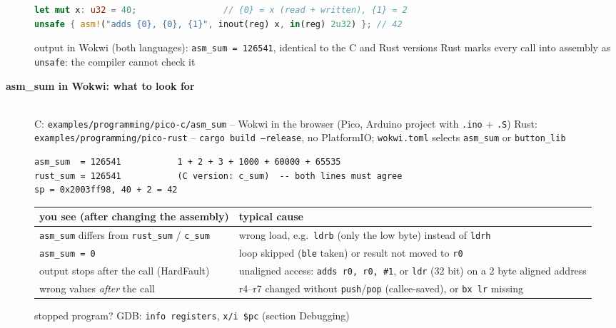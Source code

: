 \begin{description}
\begin{lstlisting}[language=Rust]
let mut x: u32 = 40;                 // {0} = x (read + written), {1} = 2
unsafe { asm!("adds {0}, {0}, {1}", inout(reg) x, in(reg) 2u32) }; // 42
\end{lstlisting}
\bi
	\ite output in Wokwi (both languages): \texttt{asm\_sum = 126541}, identical to the C and Rust versions
	\ite Rust marks every call into assembly as \texttt{unsafe}: the compiler cannot check it
\ei
\os{\newpage}


\item[{\rot\bf asm\_sum in Wokwi: what to look for}]~\\[-\lblskip]
\bi
	\ite C: \texttt{examples/programming/pico-c/asm\_sum} -- Wokwi in the browser (Pico, Arduino project with \texttt{.ino} + \texttt{.S})
	\ite Rust: \texttt{examples/programming/pico-rust} -- \texttt{cargo build --release}, no PlatformIO; \texttt{wokwi.toml} selects \texttt{asm\_sum} or \texttt{button\_lib}
\ei
\begin{lstlisting}[language={}]
asm_sum  = 126541           1 + 2 + 3 + 1000 + 60000 + 65535
rust_sum = 126541           (C version: c_sum)  -- both lines must agree
sp = 0x2003ff98, 40 + 2 = 42
\end{lstlisting}
\begin{center}
{\small%
\begin{tabularx}{\linewidth}{|L|L|}
\hline
\textbf{you see (after changing the assembly)} & \textbf{typical cause} \\
\hline
\texttt{asm\_sum} differs from \texttt{rust\_sum} / \texttt{c\_sum} & wrong load, e.g.\ \texttt{ldrb} (only the low byte) instead of \texttt{ldrh} \\
\texttt{asm\_sum = 0} & loop skipped (\texttt{ble} taken) or result not moved to \texttt{r0} \\
output stops after the call (HardFault) & unaligned access: \texttt{adds r0, r0, \#1}, or \texttt{ldr} (32 bit) on a 2 byte aligned address \\
wrong values \emph{after} the call & r4--r7 changed without \texttt{push}/\texttt{pop} (callee-saved), or \texttt{bx lr} missing \\
\hline
\end{tabularx}}
\end{center}
\bi
	\ite stopped program? GDB: \texttt{info registers}, \texttt{x/i \$pc} (section Debugging)
\ei
\os{\newpage}
\end{description}

